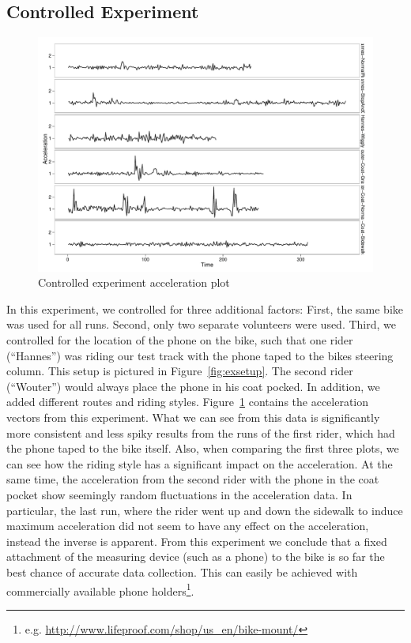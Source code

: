 \documentclass[a4paper,11pt]{article}
\begin{document}
\subsection{Controlled Experiment}

\begin{figure}
\centering
\includegraphics[width=13cm]{figures/accelerationplot-2}
\caption{Controlled experiment acceleration plot}
\label{fig:accplot2}
\end{figure}


In this experiment, we controlled for three additional factors: First, the same bike was used for all runs. Second, only two separate volunteers were used. Third, we controlled for the location of the phone on the bike, such that one rider (``Hannes'') was riding our test track with the phone taped to the bikes steering column. This setup is pictured in Figure~\ref{fig:exsetup}. The second rider (``Wouter'') would always place the phone in his coat pocked. In addition, we added different routes and riding styles. Figure~\ref{fig:accplot2} contains the acceleration vectors from this experiment. What we can see from this data is significantly more consistent and less spiky results from the runs of the first rider, which had the phone taped to the bike itself. Also, when comparing the first three plots, we can see how the riding style has a significant impact on the acceleration. At the same time, the acceleration from the second rider with the phone in the coat pocket show seemingly random fluctuations in the acceleration data. In particular, the last run, where the rider went up and down the sidewalk to induce maximum acceleration did not seem to have any effect on the acceleration, instead the inverse is apparent. From this experiment we conclude that a fixed attachment of the measuring device (such as a phone) to the bike is so far the best chance of accurate data collection. This can easily be achieved with commercially available phone holders\footnote{e.g. \url{http://www.lifeproof.com/shop/us_en/bike-mount/}}.
\end{document}
